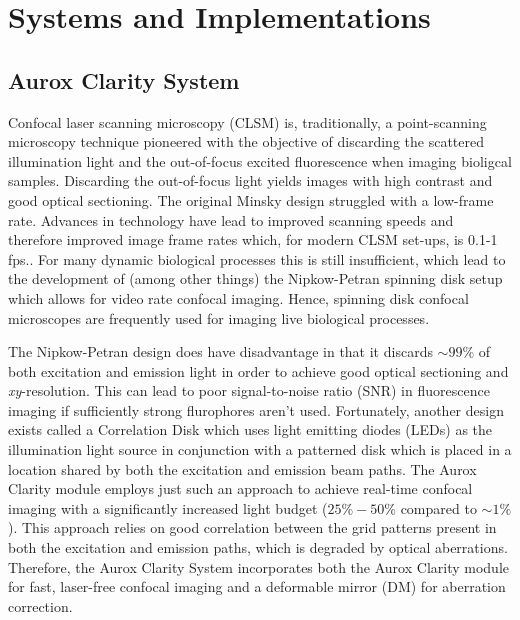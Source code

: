 \chapter{Systems and Implementations}
\label{chpt:sytems}

\section{Aurox Clarity System}
\label{sec:aurox}

Confocal laser scanning microscopy (CLSM) is, traditionally, a point-scanning microscopy technique pioneered with the objective of discarding the scattered illumination light and the out-of-focus excited fluorescence when imaging bioligcal samples.\cite{minsky1988memoir} Discarding the out-of-focus light yields images with high contrast and good optical sectioning.\cite{nwaneshiudu2012introduction} The original Minsky design struggled with a low-frame rate. Advances in technology have lead to improved scanning speeds and therefore improved image frame rates which, for modern CLSM set-ups, is 0.1-1 fps.\cite{xiao1988real,schermelleh2010guide}. For many dynamic biological processes this is still insufficient, which lead to the development of (among other things) the Nipkow-Petran spinning disk setup which allows for video rate confocal imaging.\cite{egger1967new,fuseler2018types,tsien1995video} Hence, spinning disk confocal microscopes are frequently used for imaging live biological processes.

The Nipkow-Petran design does have disadvantage in that it discards $\sim99\%$ of both excitation and emission light in order to achieve good optical sectioning and \textit{xy}-resolution.\cite{kino1995intermediate} This can lead to poor signal-to-noise ratio (SNR) in fluorescence imaging if sufficiently strong flurophores aren't used.\cite{semwogerere2005confocal} Fortunately, another design exists called a Correlation Disk which uses light emitting diodes (LEDs) as the illumination light source in conjunction with a patterned disk which is placed in a location shared by both the excitation and emission beam paths.\cite{juskaitis1996efficient,wilson1996confocal,neil1997method} The Aurox Clarity module employs just such an approach to achieve real-time confocal imaging with a significantly increased light budget ($25\%-50\%$ compared to $\sim1\%$). This approach relies on good correlation between the grid patterns present in both the excitation and emission paths, which is degraded by optical aberrations.\cite{hussain2020sensorless} Therefore, the Aurox Clarity System incorporates both the Aurox Clarity module for fast, laser-free confocal imaging and a deformable mirror (DM) for aberration correction.

